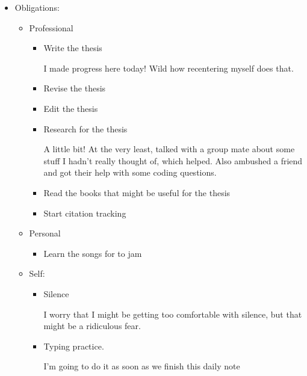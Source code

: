 \documentclass[12pt]{article}
\renewcommand{\,}{\textsuperscript{,}}
\begin{document}
\begin{itemize}

\item Obligations:

\begin{itemize}

\item Professional

\begin{itemize}

\item Write the thesis

I made progress here today! Wild how recentering myself does that.

\item Revise the thesis

\item Edit the thesis

\item Research for the thesis

A little bit! At the very least, talked with a group mate about some stuff I hadn't really thought of, which helped.  
Also ambushed a friend and got their help with some coding questions.

\item Read the books that might be useful for the thesis

\item Start citation tracking

\end{itemize}

\item Personal

\begin{itemize}

\item Learn the songs for to jam

\end{itemize}

\item Self:

\begin{itemize}

\item Silence

I worry that I might be getting too comfortable with silence, but that might be a ridiculous fear.

\item Typing practice.

I'm going to do it as soon as we finish this daily note


\end{itemize}
\end{itemize}
\end{itemize}
\end{document}

